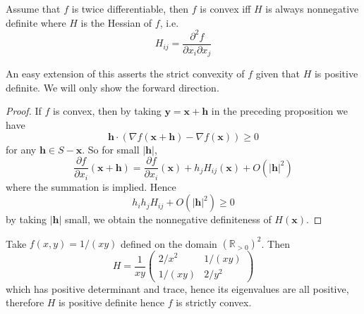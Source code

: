 \documentclass{article}
\begin{document}
\begin{proposition}
    Assume that $f$ is twice differentiable, then $f$ is convex iff $H$ is always nonnegative definite where $H$ is the Hessian of $f$, i.e.
    $$H_{ij}=\frac{\partial^2f}{\partial x_i\partial x_j}$$
\end{proposition}
An easy extension of this asserts the strict convexity of $f$ given that $H$ is positive definite.
We will only show the forward direction.
\begin{proof}
    If $f$ is convex, then by taking $\mathbf{y}=\mathbf{x}+\mathbf{h}$ in the preceding proposition we have
    $$\mathbf{h}\cdot(\nabla f(\mathbf{x}+\mathbf{h})-\nabla f(\mathbf{x}))\ge 0$$
    for any $\mathbf{h}\in S-\mathbf{x}$.
    So for small $|\mathbf{h}|$,
    $$\frac{\partial f}{\partial x_i}(\mathbf{x}+\mathbf{h})=\frac{\partial f}{\partial x_i}(\mathbf{x})+h_jH_{ij}(\mathbf{x})+O(|\mathbf{h}|^2)$$
    where the summation is implied.
    Hence
    $$h_ih_jH_{ij}+O(|\mathbf{h}|^2)\ge 0$$
    by taking $|\mathbf{h}|$ small, we obtain the nonnegative definiteness of $H(\mathbf{x})$.
\end{proof}
\begin{example}
    Take $f(x,y)=1/(xy)$ defined on the domain $(\mathbb R_{>0})^2$.
    Then
    $$H=\frac{1}{xy}\begin{pmatrix}
        2/x^2&1/(xy)\\
        1/(xy)&2/y^2
    \end{pmatrix}$$
    which has positive determinant and trace, hence its eigenvalues are all positive, therefore $H$ is positive definite hence $f$ is strictly convex.
\end{example}
\end{document}

